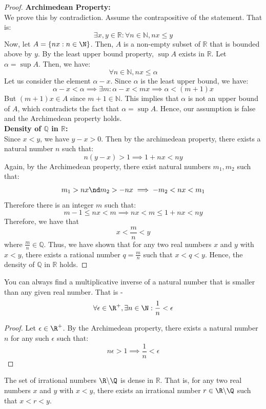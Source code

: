 \documentclass[openany]{book}
\begin{document}
\begin{proof}
\textbf{Archimedean Property:} \\
We prove this by contradiction. Assume the contrapositive of the statement. That is: 
$$\exists x, y \in \mathbb{R}: \forall n \in \mathbb{N}, nx \leq y$$
Now, let $A = \{nx: n \in \N\}$. Then, $A$ is a non-empty subset of $\mathbb{R}$ that is bounded above by $y$. By the least upper bound property, $\sup A$ exists in $\mathbb{R}$. Let $\alpha = \sup A$. Then, we have:
$$\forall n \in \mathbb{N}, nx \leq \alpha$$ 
Let us consider the element $\alpha - x$. Since $\alpha$ is the least upper bound, we have:
$$\alpha - x < \alpha \implies \exists m: \alpha - x < mx \implies \alpha < (m+1)x$$
But $(m+1)x \in A$ since $m+1 \in \mathbb{N}$. This implies that $\alpha$ is not an upper bound of $A$, which contradicts the fact that $\alpha = \sup A$. Hence, our assumption is false and the Archimedean property holds. \\
\textbf{Density of $\mathbb{Q}$ in $\mathbb{R}$:} \\
Since $x < y$, we have $y - x >0$. Then by the archimedean property, there exists a natural number $n$ such that:
$$n(y - x) > 1 \implies 1 + nx < ny$$
Again, by the Archimedean property, there exist natural numbers $m_1, m_2$ such that:
$$m_1 > nx \nd m_2 > -nx \implies -m_2 < nx < m_1$$
Therefore there is an integer $m$ such that: 
$$m-1 \leq nx < m \implies nx < m \leq 1 + nx < ny$$
Therefore, we have that $$x < \frac{m}{n} < y$$
where $\frac{m}{n} \in \mathbb{Q}$. Thus, we have shown that for any two real numbers $x$ and $y$ with $x < y$, there exists a rational number $q = \frac{m}{n}$ such that $x < q < y$. Hence, the density of $\mathbb{Q}$ in $\mathbb{R}$ holds.
\end{proof}
\begin{corollary}
    You can always find a multiplicative inverse of a natural number that is smaller than any given real number. That is - 
    $$\forall \epsilon \in \R^{+}, \exists n \in \N: \frac{1}{n} < \epsilon$$
\end{corollary}
\begin{proof}
Let $\epsilon \in \R^{+}$. By the Archimedean property, there exists a natural number $n$ for any such $\epsilon$ such that:
$$n\epsilon > 1 \implies \frac{1}{n} < \epsilon$$

\end{proof}
\begin{mytheorem}
The set of irrational numbers $\R \backslash \Q$ is dense in $\mathbb{R}$. That is, for any two real numbers $x$ and $y$ with $x < y$, there exists an irrational number $r \in \R \backslash \Q$ such that $x < r < y$.
\end{mytheorem}
\end{document}
